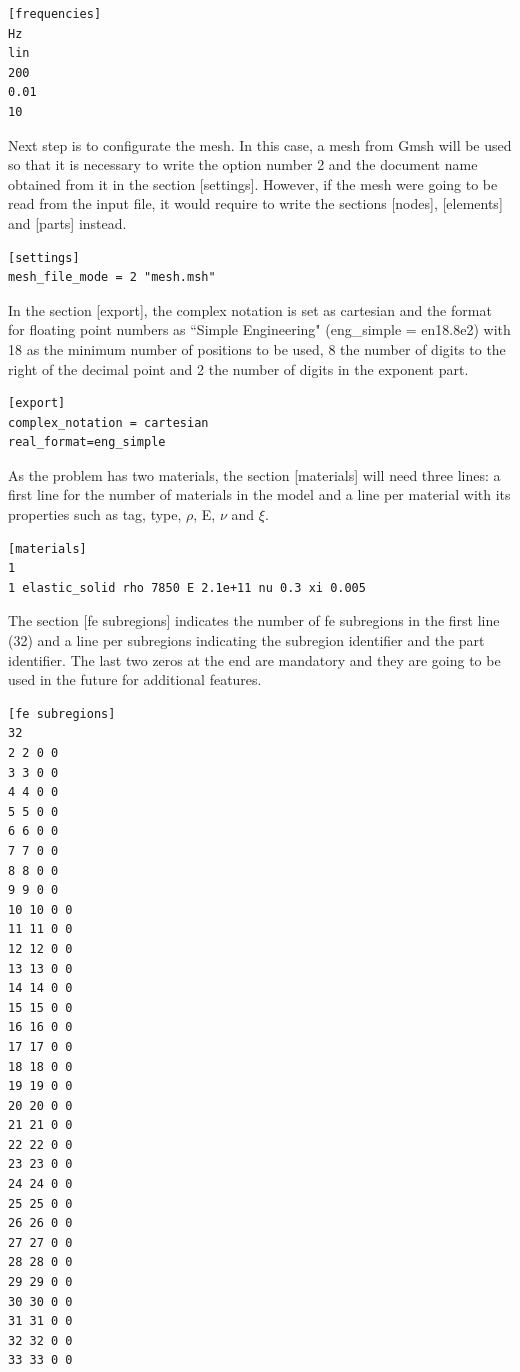 \documentclass[a4]{article}
\begin{document}
\begin{Verbatim}
[frequencies]
Hz
lin
200
0.01
10
\end{Verbatim}

Next step is to configurate the mesh. In this case, a mesh from Gmsh will be used so that it is necessary to write the option number 2 and the document name obtained from it in the section [settings]. However, if the mesh were going to be read from the input file, it would require to write the sections [nodes], [elements] and [parts] instead.

\begin{Verbatim}	
[settings]
mesh_file_mode = 2 "mesh.msh"
\end{Verbatim}

In the section [export], the complex notation is set as cartesian and the format for floating point numbers as ``Simple Engineering" (eng\_simple = en18.8e2) with 18 as the minimum number of positions to be used, 8 the number of digits to the right of the decimal point and 2 the number of digits in the exponent part. 

\begin{Verbatim}
[export]
complex_notation = cartesian
real_format=eng_simple
\end{Verbatim}

As the problem has two materials, the section [materials] will need three lines: a first line for the number of materials in the model and a line per material with its properties such as tag, type, $\rho$, E, $\nu$ and $ \xi $.

\begin{Verbatim}
[materials]
1
1 elastic_solid rho 7850 E 2.1e+11 nu 0.3 xi 0.005
\end{Verbatim}

The section [fe subregions] indicates the number of fe subregions in the first line (32) and a line per subregions indicating the subregion identifier and the part identifier. The last two zeros at the end are mandatory and they are going to be used in the future for additional features.

\begin{Verbatim}
[fe subregions]
32
2 2 0 0
3 3 0 0
4 4 0 0
5 5 0 0
6 6 0 0
7 7 0 0
8 8 0 0
9 9 0 0
10 10 0 0
11 11 0 0
12 12 0 0
13 13 0 0
14 14 0 0
15 15 0 0
16 16 0 0
17 17 0 0
18 18 0 0
19 19 0 0
20 20 0 0
21 21 0 0
22 22 0 0
23 23 0 0
24 24 0 0
25 25 0 0
26 26 0 0
27 27 0 0
28 28 0 0
29 29 0 0
30 30 0 0
31 31 0 0
32 32 0 0
33 33 0 0
\end{Verbatim}
\end{document}
